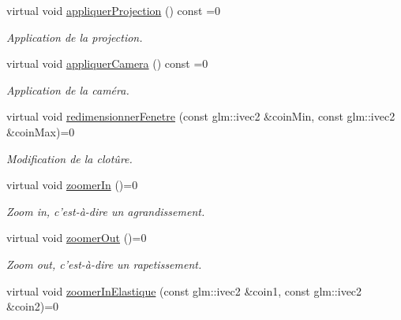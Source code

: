 \begin{DoxyCompactItemize}
\item 
\hypertarget{classvue_1_1_vue_a725bd3f8d78f4a412e2e9ee10e544295}{virtual void \hyperlink{classvue_1_1_vue_a725bd3f8d78f4a412e2e9ee10e544295}{appliquer\-Projection} () const =0}\label{classvue_1_1_vue_a725bd3f8d78f4a412e2e9ee10e544295}

\begin{DoxyCompactList}\small\item\em Application de la projection. \end{DoxyCompactList}\item 
\hypertarget{classvue_1_1_vue_a478eb021e357d22ef5e349ee895581ab}{virtual void \hyperlink{classvue_1_1_vue_a478eb021e357d22ef5e349ee895581ab}{appliquer\-Camera} () const =0}\label{classvue_1_1_vue_a478eb021e357d22ef5e349ee895581ab}

\begin{DoxyCompactList}\small\item\em Application de la caméra. \end{DoxyCompactList}\item 
\hypertarget{classvue_1_1_vue_aee55f95ee78ff1588baf1cb1768b6bfe}{virtual void \hyperlink{classvue_1_1_vue_aee55f95ee78ff1588baf1cb1768b6bfe}{redimensionner\-Fenetre} (const glm\-::ivec2 \&coin\-Min, const glm\-::ivec2 \&coin\-Max)=0}\label{classvue_1_1_vue_aee55f95ee78ff1588baf1cb1768b6bfe}

\begin{DoxyCompactList}\small\item\em Modification de la clotûre. \end{DoxyCompactList}\item 
\hypertarget{classvue_1_1_vue_af2fbeaeb97b40dc71d755d4f5e185ab2}{virtual void \hyperlink{classvue_1_1_vue_af2fbeaeb97b40dc71d755d4f5e185ab2}{zoomer\-In} ()=0}\label{classvue_1_1_vue_af2fbeaeb97b40dc71d755d4f5e185ab2}

\begin{DoxyCompactList}\small\item\em Zoom in, c'est-\/à-\/dire un agrandissement. \end{DoxyCompactList}\item 
\hypertarget{classvue_1_1_vue_a90d184491ccfb6a93839a2e9bd48bac1}{virtual void \hyperlink{classvue_1_1_vue_a90d184491ccfb6a93839a2e9bd48bac1}{zoomer\-Out} ()=0}\label{classvue_1_1_vue_a90d184491ccfb6a93839a2e9bd48bac1}

\begin{DoxyCompactList}\small\item\em Zoom out, c'est-\/à-\/dire un rapetissement. \end{DoxyCompactList}\item 
\hypertarget{classvue_1_1_vue_a1992e78b23c4b3ece118f44f35b97c0e}{virtual void \hyperlink{classvue_1_1_vue_a1992e78b23c4b3ece118f44f35b97c0e}{zoomer\-In\-Elastique} (const glm\-::ivec2 \&coin1, const glm\-::ivec2 \&coin2)=0}\label{classvue_1_1_vue_a1992e78b23c4b3ece118f44f35b97c0e}


\end{DoxyCompactItemize}
